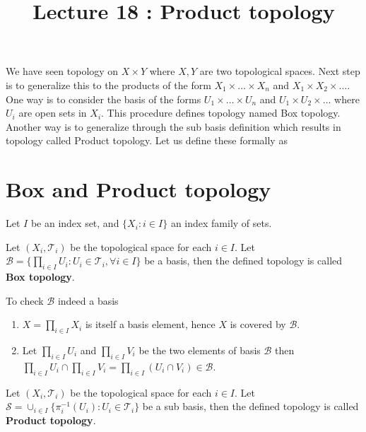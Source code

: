 \documentclass[a4paper,english,12pt]{article}   	%
\title{Lecture 18 :  Product topology}
\author{}
\begin{document}
\maketitle
We have seen topology on $X \times Y$ where $X,Y$ are two topological spaces. Next  step is to generalize this to the products of the form $X_{1} \times \ldots  \times X_{n}$ and $X_{1} \times X_{2} \times \ldots$. One way is to consider the basis of the forms $U_{1} \times \ldots  \times U_{n}$ and $U_{1} \times U_{2} \times \ldots$ where $U_{i}$ are open sets in $X_{i}$. This procedure defines topology named Box topology. Another way is to generalize through the sub basis definition which results in topology called Product topology. Let us define these formally as  
\section{Box and Product topology} 
Let $I$ be an index set, and $\{X_{i} \colon i \in I\}$ an index family of sets.
\begin{defn}
Let $(X_{i},\mathcal{T}_{i})$ be the topological space for each $i \in I$. Let $\mathcal{B} = \{\prod_{i \in I} U_{i} \colon U_{i} \in \mathcal{T}_{i} , \forall i \in I \}$ be a basis, then the defined topology is called \textbf{Box topology}.
\end{defn}
To check $\mathcal{B}$ indeed a basis
\begin{enumerate}
\item $X = \prod_{i \in I} X_{i} $ is itself a basis element, hence $X$ is covered by $\mathcal{B}$.
\item Let $\prod_{i \in I} U_{i}$ and $\prod_{i \in I} V_{i}$ be the two elements of basis $\mathcal{B}$ then $\prod_{i \in I} U_{i} \cap \prod_{i \in I} V_{i} = \prod_{i \in I} (U_{i} \cap V_{i}) \in \mathcal{B}$.
\end{enumerate}

\begin{defn}
Let $(X_{i},\mathcal{T}_{i})$ be the topological space for each $i \in I$. Let $\mathcal{S} = \cup_{i \in I} \{\pi_{i}^{-1} (U_{i})  \colon U_{i} \in \mathcal{T}_{i}  \}$ be a sub basis, then the defined topology is called \textbf{Product topology}.
\end{defn}
\end{document}
